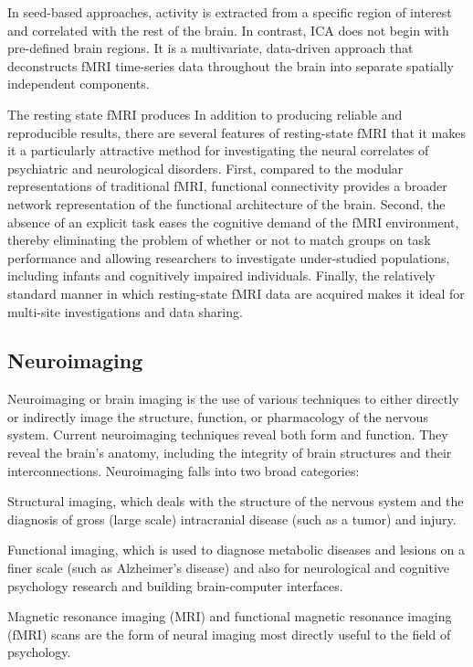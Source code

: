 \documentclass{article}
\begin{document}
In seed-based approaches, activity is extracted from a specific region
of interest and correlated with the rest of the brain. In contrast,
ICA does not begin with pre-defined brain regions. It is a
multivariate, data-driven approach that deconstructs fMRI time-series
data throughout the brain into separate spatially independent
components.


The resting state fMRI produces
In addition to producing reliable and reproducible results, there are
several features of resting-state fMRI that it makes it a particularly
attractive method for investigating the neural correlates of
psychiatric and neurological disorders. First, compared to the modular
representations of traditional fMRI, functional connectivity provides
a broader network representation of the functional architecture of the
brain. Second, the absence of an explicit task eases the cognitive
demand of the fMRI environment, thereby eliminating the problem of
whether or not to match groups on task performance and allowing
researchers to investigate under-studied populations, including
infants and cognitively impaired individuals.  Finally, the relatively
standard manner in which resting-state fMRI data are acquired makes it
ideal for multi-site investigations and data sharing.

\subsection{Neuroimaging}

Neuroimaging or brain imaging is the use of various techniques to
either directly or indirectly image the structure, function, or
pharmacology of the nervous system. Current neuroimaging techniques
reveal both form and function. They reveal the brain's anatomy,
including the integrity of brain structures and their
interconnections. Neuroimaging falls into two broad categories:

Structural imaging, which deals with the structure of the nervous
system and the diagnosis of gross (large scale) intracranial disease
(such as a tumor) and injury.

Functional imaging, which is used to diagnose metabolic diseases and
lesions on a finer scale (such as Alzheimer's disease) and also for
neurological and cognitive psychology research and building
brain-computer interfaces.

Magnetic resonance imaging (MRI) and functional magnetic resonance
imaging (fMRI) scans are the form of neural imaging most directly
useful to the field of psychology.
\end{document}
